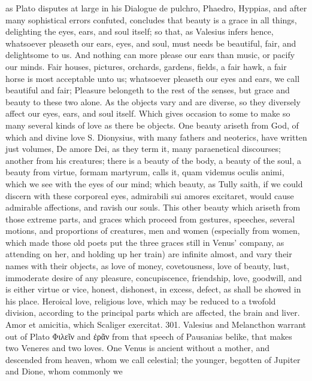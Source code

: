 {as Plato disputes at large in his Dialogue de pulchro, Phaedro,
Hyppias, and after many sophistical errors confuted, concludes that
beauty is a grace in all things, delighting the eyes, ears, and soul
itself; so that, as Valesius infers hence, whatsoever pleaseth our
ears, eyes, and soul, must needs be beautiful, fair, and delightsome to
us. And nothing can more please our ears than music, or pacify
our minds. Fair houses, pictures, orchards, gardens, fields, a fair
hawk, a fair horse is most acceptable unto us; whatsoever pleaseth our
eyes and ears, we call beautiful and fair; Pleasure belongeth to
the rest of the senses, but grace and beauty to these two alone. As the
objects vary and are diverse, so they diversely affect our eyes, ears,
and soul itself. Which gives occasion to some to make so many several
kinds of love as there be objects. One beauty ariseth from God, of
which and divine love S. Dionysius, with many fathers and
neoterics, have written just volumes, De amore Dei, as they term it,
many paraenetical discourses; another from his creatures; there is a
beauty of the body, a beauty of the soul, a beauty from virtue, formam
martyrum, \Austin{} calls it, quam videmus oculis animi, which we see with
the eyes of our mind; which beauty, as Tully saith, if we could discern
with these corporeal eyes, admirabili sui amores excitaret, would cause
admirable affections, and ravish our souls. This other beauty which
ariseth from those extreme parts, and graces which proceed from
gestures, speeches, several motions, and proportions of creatures, men
and women (especially from women, which made those old poets put the
three graces still in Venus' company, as attending on her, and holding
up her train) are infinite almost, and vary their names with their
objects, as love of money, covetousness, love of beauty, lust,
immoderate desire of any pleasure, concupiscence, friendship, love,
goodwill, \etc{} and is either virtue or vice, honest, dishonest, in
excess, defect, as shall be showed in his place. Heroical love,
religious love, \etc{} which may be reduced to a twofold division,
according to the principal parts which are affected, the brain and
liver. Amor et amicitia, which Scaliger exercitat. 301. Valesius and
Melancthon warrant out of Plato Φιλεῖν and ἐρᾶν from that speech of
Pausanias belike, that makes two Veneres and two loves. One Venus
is ancient without a mother, and descended from heaven, whom we call
celestial; the younger, begotten of Jupiter and Dione, whom commonly we
}
